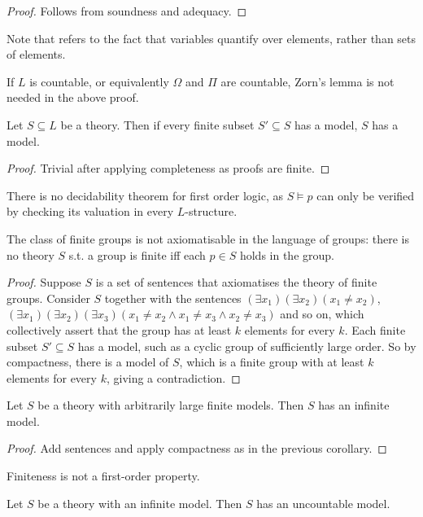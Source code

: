 \begin{proof}
    Follows from soundness and adequacy.
\end{proof}
Note that  refers to the fact that variables quantify over elements, rather than sets of elements.
\begin{remark}
    If $L$ is countable, or equivalently $\Omega$ and $\Pi$ are countable, Zorn's lemma is not needed in the above proof.
\end{remark}
\begin{theorem}
    Let $S \subseteq L$ be a theory.
    Then if every finite subset $S' \subseteq S$ has a model, $S$ has a model.
\end{theorem}
\begin{proof}
    Trivial after applying completeness as proofs are finite.
\end{proof}
There is no decidability theorem for first order logic, as $S \models p$ can only be verified by checking its valuation in every $L$-structure.
\begin{corollary}
    The class of finite groups is not axiomatisable in the language of groups: there is no theory $S$ s.t. a group is finite iff each $p \in S$ holds in the group.
\end{corollary}
\begin{proof}
    Suppose $S$ is a set of sentences that axiomatises the theory of finite groups.
    Consider $S$ together with the sentences $(\exists x_1)(\exists x_2)(x_1 \neq x_2)$, $(\exists x_1)(\exists x_2)(\exists x_3)(x_1 \neq x_2 \wedge x_1 \neq x_3 \wedge x_2 \neq x_3)$ and so on, which collectively assert that the group has at least $k$ elements for every $k$.
    Each finite subset $S' \subseteq S$ has a model, such as a cyclic group of sufficiently large order.
    So by compactness, there is a model of $S$, which is a finite group with at least $k$ elements for every $k$, giving a contradiction.
\end{proof}
\begin{corollary}
    Let $S$ be a theory with arbitrarily large finite models.
    Then $S$ has an infinite model.
\end{corollary}
\begin{proof}
    Add sentences and apply compactness as in the previous corollary.
\end{proof}
Finiteness is not a first-order property.
\begin{theorem}
    Let $S$ be a theory with an infinite model.
    Then $S$ has an uncountable model.
\end{theorem}
